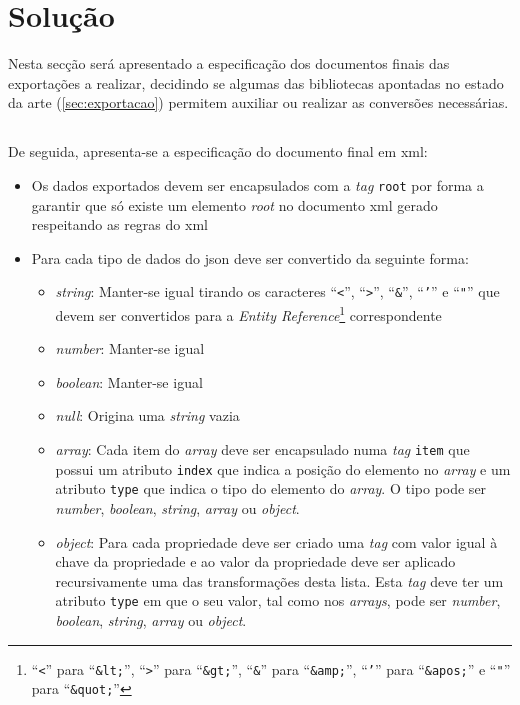 \section{Solução}

Nesta secção será apresentado a especificação dos documentos finais das exportações a realizar, decidindo se algumas das bibliotecas apontadas no estado da arte (\ref{sec:exportacao}) permitem auxiliar ou realizar as conversões necessárias.

\subsection{}

De seguida, apresenta-se a especificação do documento final em \acrshort{xml}:
\begin{itemize}
    \item Os dados exportados devem ser encapsulados com a \textit{tag} \texttt{root} por forma a garantir que só existe um elemento \textit{root} no documento \acrshort{xml} gerado respeitando as regras do \acrshort{xml}
    \item Para cada tipo de dados do \acrshort{json} deve ser convertido da seguinte forma:
    \begin{itemize}
        \item \textit{string}: Manter-se igual tirando os caracteres ``\texttt{<}'', ``\texttt{>}'', ``\texttt{\&}'', ``\texttt{'}'' e ``\texttt{"}'' que devem ser convertidos para a \textit{Entity Reference}\footnote{``\texttt{<}'' para ``\texttt{\&lt;}'', ``\texttt{>}'' para ``\texttt{\&gt;}'', ``\texttt{\&}'' para ``\texttt{\&amp;}'', ``\texttt{'}'' para ``\texttt{\&apos;}'' e ``\texttt{"}'' para ``\texttt{\&quot;}''} correspondente
        \item \textit{number}: Manter-se igual
        \item \textit{boolean}: Manter-se igual
        \item \textit{null}: Origina uma \textit{string} vazia
        \item \textit{array}: Cada item do \textit{array} deve ser encapsulado numa \textit{tag} \texttt{item} que possui um atributo \texttt{index} que indica a posição do elemento no \textit{array} e um atributo \texttt{type} que indica o tipo do elemento do \textit{array}. O tipo pode ser \textit{number}, \textit{boolean}, \textit{string}, \textit{array} ou \textit{object}.
        \item \textit{object}: Para cada propriedade deve ser criado uma \textit{tag} com valor igual à chave da propriedade e ao valor da propriedade deve ser aplicado recursivamente uma das transformações desta lista. Esta \textit{tag} deve ter um atributo \texttt{type} em que o seu valor, tal como nos \textit{arrays}, pode ser \textit{number}, \textit{boolean}, \textit{string}, \textit{array} ou \textit{object}.
    \end{itemize}
\end{itemize}

